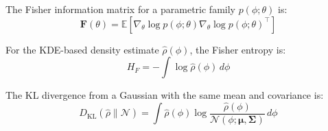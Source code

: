 \documentclass[10pt]{article}
\begin{document}
The Fisher information matrix for a parametric family $p(\phi; \theta)$ is:
\[
\mathbf{F}(\theta) = \mathbb{E}\left[ \nabla_\theta \log p(\phi; \theta) \nabla_\theta \log p(\phi; \theta)^\top \right]
\]

For the KDE-based density estimate $\hat{\rho}(\phi)$, the Fisher entropy is:
\[
H_F = -\int \log \hat{\rho}(\phi) \, d\phi
\]

The KL divergence from a Gaussian with the same mean and covariance is:
\[
D_{\text{KL}}(\hat{\rho} \| \mathcal{N}) = \int \hat{\rho}(\phi) \log \frac{\hat{\rho}(\phi)}{\mathcal{N}(\phi; \boldsymbol{\mu}, \boldsymbol{\Sigma})} \, d\phi
\]
\end{document}
